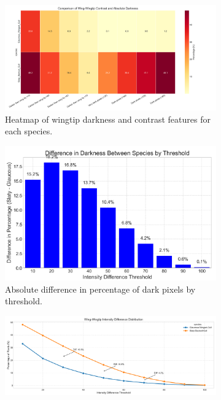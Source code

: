 \documentclass[a4paper,12pt]{report}
\begin{document}
\begin{figure}[H]
    \centering
    \begin{subfigure}[b]{0.48\textwidth}
        \centering
        \includegraphics[width=\textwidth]{images/REPORT_IMAGES_INTENSITY/I1/wingtip_darkness_heatmap.png}
        \caption{Heatmap of wingtip darkness and contrast features for each species.}
        \label{fig:intensity_heatmap}
    \end{subfigure}
    \hfill
    \begin{subfigure}[b]{0.48\textwidth}
        \centering
        \includegraphics[width=\textwidth]{images/REPORT_IMAGES_INTENSITY/I1/diffbythresh.png}
        \caption{Absolute difference in percentage of dark pixels by threshold.}
        \label{fig:diff_bar}
    \end{subfigure}
    \vspace{1em}
    \begin{subfigure}[b]{0.48\textwidth}
        \centering
        \includegraphics[width=\textwidth]{images/REPORT_IMAGES_INTENSITY/I1/intensitydiffthreshold.png}

\end{subfigure}
\end{figure}
\end{document}
